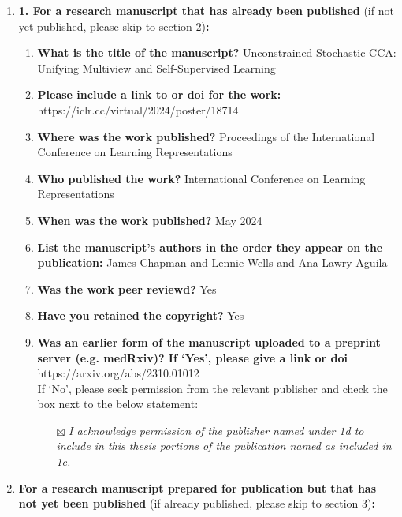 
\begin{enumerate}\itemsep0em
%		
	\item \textbf{1.	For a research manuscript that has already been published} (if not yet published, please skip to section 2)\textbf{:}
%
	\begin{enumerate}\itemsep0em
%			
		\item \textbf{What is the title of the manuscript?}
		Unconstrained Stochastic CCA: Unifying Multiview and Self-Supervised Learning
		\item \textbf{Please include a link to or doi for the work:}
		https://iclr.cc/virtual/2024/poster/18714
		\item \textbf{Where was the work published?}
		Proceedings of the International Conference on Learning Representations
		\item \textbf{Who published the work?}
		International Conference on Learning Representations
		\item \textbf{When was the work published?}
		May 2024
		\item \textbf{List the manuscript's authors in the order they appear on the publication:}
		James Chapman and Lennie Wells and Ana Lawry Aguila
		\item \textbf{Was the work peer reviewd?}
		Yes
		\item \textbf{Have you retained the copyright?}
		Yes
		\item \textbf{Was an earlier form of the manuscript uploaded to a preprint server (e.g. medRxiv)? If ‘Yes’, please give a link or doi} 
		https://arxiv.org/abs/2310.01012
		\\
		If ‘No’, please seek permission from the relevant publisher and check the box next to the below statement:
%			
		\begin{itemize}\itemsep0em
			\item[$\boxtimes$] {\itshape I acknowledge permission of the publisher named under 1d to include in this thesis portions of the publication named as included in 1c.}
		\end{itemize}
%		
	\end{enumerate}
%	
	\item \textbf{For a research manuscript prepared for publication but that has not yet been published} (if already published, please skip to section 3)\textbf{:}

\end{enumerate}
